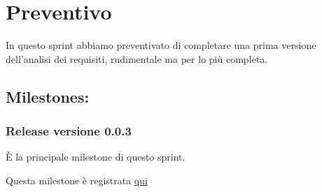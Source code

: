 \section{Preventivo}

In questo sprint abbiamo preventivato di completare una prima versione dell'analisi dei requisiti, rudimentale ma per lo più completa.

\subsection{Milestones:}  
\subsubsection{Release versione 0.0.3}

È la principale milestone di questo sprint.

Questa milestone è registrata \href{https://github.com/SWEasabi/analisi-dei-requisiti/milestone/3}{qui}
